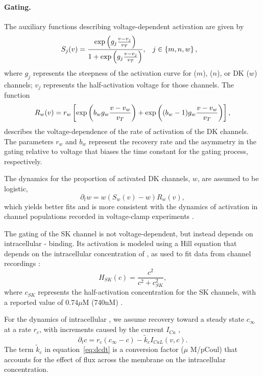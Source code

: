 \documentclass[12pt]{article}
\begin{document}
\paragraph{Gating.} 
The auxiliary functions describing voltage-dependent activation are given by
\begin{align}
S_j(v) &= \frac{\textrm{exp}\left(g_j \frac{v-v_j}{v_T} \right)}{1 + \textrm{exp}\left(g_j \frac{v-v_j}{v_T} \right)}, \hspace{0.3cm} j \in \left\{m,n,w\right\}, 
\label{eq:gating}
\end{align}
where $g_j$ represents the steepness of the activation curve for \Na ($m$), \Ca ($n$), or DK ($w$) channels; $v_j$ represents the half-activation voltage for those channels. 
The function
\begin{equation}
    R_w(v) = r_w \left[ \exp \left(b_w g_w\frac{v-v_w}{v_T}\right) + \exp \left((b_w-1)g_w\frac{v-v_w}{v_T}\right)\right],
\label{eq:actRate}
\end{equation}  
describes the voltage-dependence of the rate of activation of the DK channels. The parameters  $r_w$ and $b_w$ represent the recovery rate  and  the asymmetry in the gating relative to voltage that biases the time constant for the gating process, respectively. 

The dynamics for the proportion of activated DK channels, $w$,  are assumed to be logistic,
\begin{equation}
\partial_t{w} = w (S_w(v)-w)  R_w(v), \label{eq:dwdt}
\end{equation}
which yields better fits and is more consistent with the dynamics of activation in channel populations recorded in voltage-clamp experiments \citep{Covarrubiasetal1991,hodgkin1952quantitative,TsunodaSalkoff1995b}.

The gating of the SK channel is not voltage-dependent, but instead depends on intracellular \Ca- binding. Its activation is modeled using a Hill equation that depends on the intracellular concentration of \Ca, as used to fit data from channel recordings \citep{hirschberg1999gating}:
\begin{equation}
H_{SK}(c) = \frac{c^2}{c^2 + c_{SK}^2},
\end{equation}
where $c_{SK}$ represents the half-activation \Ca concentration for the SK channels, with a reported value of 0.74$\mu$M (740nM) \citep{hirschberg1998gating,stocker20042+}.

For the dynamics of intracellular {\Ca}, we assume recovery toward a steady state $c_{\infty}$ at a rate $r_c$, with increments caused by the {\Ca} current $I_{Ca}$ \citep{avron1991minimal},
\begin{equation}
\partial_t{c} = r_{c}({c_{\infty} - c}) - \tilde{k}_{c} I_{CaL}(v,c).
\label{eq:dcdt}
\end{equation}
The term $\tilde{k}_c$ in equation~\eqref{eq:dcdt} is a conversion factor ($\mu$ M/pCoul) that accounts for the effect of {\Ca} flux across the membrane on the intracellular {\Ca} concentration. 
\end{document}
